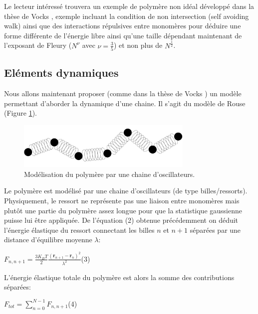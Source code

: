 \documentclass[a4paper,11pt]{article}
\begin{document}
 Le lecteur intéressé trouvera un exemple de polymère non idéal développé dans la thèse de Vocks \cite{these}, exemple incluant la condition de non intersection (self avoiding walk) ainsi que des interactions répulsives entre monomères pour déduire une forme différente de l'énergie libre ainsi qu'une taille dépendant maintenant de l'exposant de Fleury ($N^{\nu}$ avec $\nu=\frac{3}{5}$) et non plus de $N^{\frac{1}{2}}$.

\subsection{Eléments dynamiques}

Nous allons maintenant proposer (comme dans la thèse de Vocks \cite{these}) un modèle permettant d'aborder la dynamique d'une chaine. Il s'agit du modèle de Rouse (Figure \ref{rouse}).

\begin{figure}[H]
\begin{center}
\includegraphics[width=0.75\textwidth]{rouse.jpg}

\caption{Modélisation du polymère par une chaine d'oscillateurs.}
\label{rouse}
\end{center}
\end{figure}

Le polymère est modélisé par une chaine d'oscillateurs (de type billes/ressorts). Physiquement, le ressort ne représente pas une liaison entre monomères mais plutôt une partie du polymère assez longue pour que la statistique gaussienne puisse lui être appliquée. De l'équation (2) obtenue précédemment on déduit l'énergie élastique du ressort connectant les billes $n$ et $n+1$ séparées par une distance d'équilibre moyenne $\lambda$:

\begin{center}

$F_{n,n+1} = \frac{3 K_B T}{2} \frac{(\textbf{r}_{n+1}-\textbf{r}_n)^2}{\lambda^2}$\flushright(3)

\end{center}

L'énergie élastique totale du polymère est alors la somme des contributions séparées:
\begin{center}

$F_{tot} = \sum_{n=0}^{N-1} F_{n,n+1}$\flushright(4)

\end{center}
\end{document}
